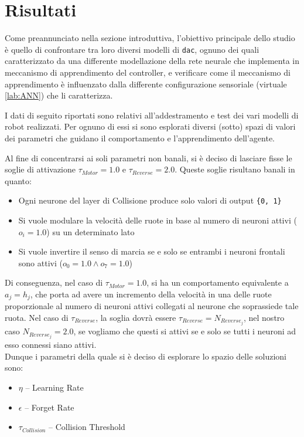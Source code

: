 \section{Risultati}

Come preannunciato nella sezione introduttiva, l'obiettivo principale dello studio è quello di confrontare tra loro diversi modelli di \texttt{dac}, ognuno dei quali caratterizzato da una differente modellazione della rete neurale che implementa in meccanismo di apprendimento del controller, e verificare come il meccanismo di apprendimento è influenzato dalla differente configurazione sensoriale (virtuale \ref{lab:ANN}) che li caratterizza.

I dati di seguito riportati sono relativi all'addestramento e test dei vari modelli di robot realizzati. Per ognuno di essi si sono esplorati diversi (sotto) spazi di valori dei parametri che guidano il comportamento e l'apprendimento dell'agente.

Al fine di concentrarsi ai soli parametri non banali, si è deciso di lasciare fisse le soglie di attivazione $\tau_{Motor}=1.0$ e $\tau_{Reverse}=2.0$. Queste soglie risultano banali in quanto:

\begin{itemize}
    \item Ogni neurone del layer di Collisione produce solo valori di output \texttt{\{0, 1\}}
    
    \item Si vuole modulare la velocità delle ruote in base al numero di neuroni attivi ($o_i=1.0$) su un determinato lato
    
    \item Si vuole invertire il senso di marcia se e solo se entrambi i neuroni frontali sono attivi ($o_0=1.0 \wedge o_7=1.0$)
\end{itemize}

Di conseguenza, nel caso di $\tau_{Motor}=1.0$, si ha un comportamento equivalente a $a_j = h_j$, che porta ad avere un incremento della velocità in una delle ruote proporzionale al numero di neuroni attivi collegati al neurone che soprassiede tale ruota. Nel caso di $\tau_{Reverse}$, la soglia dovrà essere $\tau_{Reverse}=N_{Reverse_j}$, nel nostro caso $N_{Reverse_j}=2.0$, se vogliamo che questi si attivi se e solo se tutti i neuroni ad esso connessi siano attivi.\\
\hfill\break
Dunque i parametri della quale si è deciso di esplorare lo spazio delle soluzioni sono:

\begin{itemize}
    \item $\eta$ -- Learning Rate
    \item $\epsilon$ -- Forget Rate
    \item $\tau_{Collision}$ -- Collision Threshold
\end{itemize}

